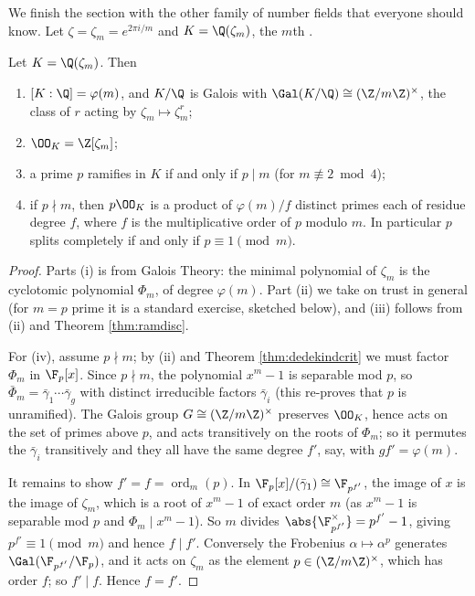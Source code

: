 We finish the section with the other family of number fields that everyone should know. Let $\zeta = \zeta_m = e^{2\pi i/m}$ and $K = \Q(\zeta_m)$, the $m$th .

\begin{proposition}\label{prop:cyclo}
	Let $K = \Q(\zeta_m)$. Then
	\begin{enumerate}[label=(\roman*)]
		\item $[K:\Q] = \varphi(m)$, and $K/\Q$ is Galois with $\Gal(K/\Q) \cong (\Z/m\Z)^\times$, the class of $r$ acting by $\zeta_m \mapsto \zeta_m^r$;
		\item $\OO_K = \Z[\zeta_m]$;
		\item a prime $p$ ramifies in $K$ if and only if $p \mid m$ (for $m \not\equiv 2 \bmod 4$);
		\item if $p \nmid m$, then $p\OO_K$ is a product of $\varphi(m)/f$ distinct primes each of residue degree $f$, where $f$ is the multiplicative order of $p$ modulo $m$. In particular $p$ splits completely if and only if $p \equiv 1 \pmod m$.
	\end{enumerate}
\end{proposition}

\begin{proof}
	Parts (i) is from Galois Theory: the minimal polynomial of $\zeta_m$ is the cyclotomic polynomial $\Phi_m$, of degree $\varphi(m)$. Part (ii) we take on trust in general (for $m = p$ prime it is a standard exercise, sketched below), and (iii) follows from (ii) and Theorem \ref{thm:ramdisc}.

	For (iv), assume $p \nmid m$; by (ii) and Theorem \ref{thm:dedekindcrit} we must factor $\Phi_m$ in $\F_p[x]$. Since $p\nmid m$, the polynomial $x^m - 1$ is separable mod $p$, so $\bar\Phi_m = \bar\gamma_1\cdots\bar\gamma_g$ with distinct irreducible factors $\bar\gamma_i$ (this re-proves that $p$ is unramified). The Galois group $G \cong (\Z/m\Z)^\times$ preserves $\OO_K$, hence acts on the set of primes above $p$, and acts transitively on the roots of $\Phi_m$; so it permutes the $\bar\gamma_i$ transitively and they all have the same degree $f'$, say, with $gf' = \varphi(m)$.

	It remains to show $f' = f = \operatorname{ord}_m(p)$. In $\F_p[x]/(\bar\gamma_1) \cong \F_{p^{f'}}$, the image of $x$ is the image of $\zeta_m$, which is a root of $x^m-1$ of exact order $m$ (as $x^m-1$ is separable mod $p$ and $\Phi_m \mid x^m-1$). So $m$ divides $\abs{\F_{p^{f'}}^\times} = p^{f'}-1$, giving $p^{f'} \equiv 1 \pmod m$ and hence $f \mid f'$. Conversely the Frobenius $\alpha\mapsto\alpha^p$ generates $\Gal(\F_{p^{f'}}/\F_p)$, and it acts on $\zeta_m$ as the element $p \in (\Z/m\Z)^\times$, which has order $f$; so $f' \mid f$. Hence $f = f'$.
\end{proof}

